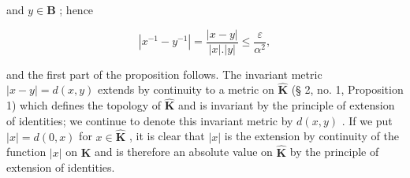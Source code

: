 and \(y\in \mathbf{B}\) ; hence

\[
\left| x ^ {- 1} - y ^ {- 1} \right| = \frac {\left| x - y \right|}{\left| x \right| . \left| y \right|} \leqslant \frac {\varepsilon}{\alpha^ {2}},
\]

and the first part of the proposition follows. The invariant metric \(|x - y| = d(x, y)\) extends by continuity to a metric on \(\hat{\mathbf{K}}\) (§ 2, no. 1, Proposition 1) which defines the topology of \(\hat{\mathbf{K}}\) and is invariant by the principle of extension of identities; we continue to denote this invariant metric by \(d(x, y)\) . If we put \(|x| = d(0, x)\) for \(x \in \hat{\mathbf{K}}\) , it is clear that \(|x|\) is the extension by continuity of the function \(|x|\) on \(\mathbf{K}\) and is therefore an absolute value on \(\hat{\mathbf{K}}\) by the principle of extension of identities.

